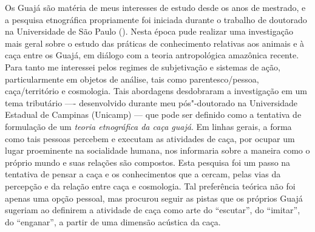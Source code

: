 Os Guajá são matéria de meus interesses de estudo desde os anos de
mestrado, e a pesquisa etnográfica propriamente foi iniciada durante o
trabalho de doutorado na Universidade de São Paulo (). Nesta época
pude realizar uma investigação mais geral sobre o estudo das práticas de
conhecimento relativas aos animais e à caça entre os Guajá, em diálogo
com a teoria antropológica amazônica recente. Para tanto me interessei
pelos regimes de subjetivação e sistemas de ação, particularmente em
objetos de análise, tais como parentesco/pessoa, caça/território e
cosmologia. Tais abordagens desdobraram a investigação em um tema
tributário ---- desenvolvido durante meu pós"-doutorado na Universidade
Estadual de Campinas (Unicamp) --- que pode ser definido como a tentativa
de formulação de um \emph{teoria etnográfica da caça guajá}. Em linhas
gerais, a forma como tais pessoas percebem e executam as atividades de
caça, por ocupar um lugar proeminente na socialidade humana, nos
informaria sobre a maneira como o próprio mundo e suas relações são
compostos. Esta pesquisa foi um passo na tentativa de pensar a caça e os
conhecimentos que a cercam, pelas vias da percepção e da relação entre
caça e cosmologia. Tal preferência teórica não foi apenas uma opção
pessoal, mas procurou seguir as pistas que os próprios Guajá sugeriam ao
definirem a atividade de caça como arte do ``escutar'', do ``imitar'', do
``enganar'', a partir de uma dimensão acústica da caça.

